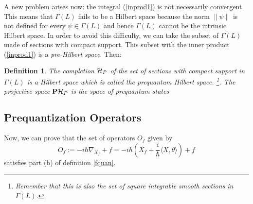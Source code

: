 \documentclass[12pt]{article}
\theoremstyle{plain}
\newtheorem{definition}{Definition}
\def\H{{\cal H}}
\begin{document}
A new problem arises now: the integral (\ref{inprod1})
is not necessarily convergent. This means that
$\Gamma (L)$ fails to be a Hilbert space
because the norm $\| \psi \|$ is not defined for every
$\psi \in \Gamma (L)$ and hence
$\Gamma (L)$ cannot be the intrinsic Hilbert space.
In order to avoid this difficulty, we can take the subset of
$\Gamma (L)$ made of sections with compact support.
This subset with the inner product
(\ref{inprod1}) is a {\it pre-Hilbert space}. Then:

\begin{definition}
The completion
$\H_P$ of the set of sections with compact support in
$\Gamma (L)$ is a Hilbert space which is called the
{\rm prequantum Hilbert space}.%
\footnote{
Remember that this is also the set of
square integrable smooth sections in $\Gamma (L)$.}.
The projective space ${\bf P}\H_P$
is the {\rm space of prequantum states}
\label{prehs}
\end{definition}



\subsection{Prequantization Operators}


Now, we can prove that the set of operators $O_f$ given by
$$
O_f := -i\hbar\nabla_{X_f} + f =
-i\hbar (X_f + \frac{i}{\hbar}\langle X, \theta \rangle ) + f
$$
satisfies part (b) of definition \ref{fquan}.
\end{document}
